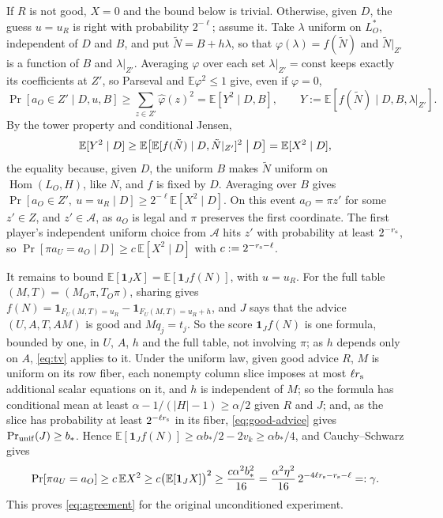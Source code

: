 \documentclass[11pt]{article}
\newcommand{\E}{\mathbb E}
\newcommand{\Hom}{\operatorname{Hom}}
\newcommand{\ind}{\mathbf 1}
\begin{document}
If $R$ is not good, $X=0$ and the bound below is trivial. Otherwise, given $D$, the guess $u=u_R$ is
right with probability $2^{-\ell}$; assume it. Take $\lambda$ uniform on
$L_O^*$, independent of $D$ and $B$, and put $\tilde N=B+h\lambda$, so that
$\varphi(\lambda)=f(\tilde N)$ and $\tilde N|_{Z'}$ is a function of $B$ and
$\lambda|_{Z'}$. Averaging $\varphi$ over each set
$\lambda|_{Z'}=\text{const}$ keeps exactly its coefficients at $Z'$, so
Parseval and $\E\varphi^2\le1$ give, even if $\varphi=0$,
\[
 \Pr[a_O\in Z'\mid D,u,B]\ge\sum_{z\in Z'}\widehat\varphi(z)^2
 =\E[Y^2\mid D,B],
 \qquad Y:=\E[f(\tilde N)\mid D,B,\lambda|_{Z'}].
\]
By the tower property and conditional Jensen,
\[
 \E[Y^2\mid D]\ge\E\bigl[\E[f(\tilde N)\mid D,\tilde N|_{Z'}]^2\bigm|D\bigr]
 =\E[X^2\mid D],
\]
the equality because, given $D$, the uniform $B$ makes $\tilde N$ uniform on
$\Hom(L_O,H)$, like $N$, and $f$ is fixed by $D$. Averaging over $B$ gives
$\Pr[a_O\in Z',\ u=u_R\mid D]\ge2^{-\ell}\E[X^2\mid D]$.
On this event $a_O=\pi z'$ for some $z'\in Z$, and $z'\in\mathcal A$, as
$a_O$ is legal and $\pi$ preserves the first coordinate. The first
player's independent uniform choice from $\mathcal A$ hits $z'$ with
probability at least $2^{-r_{\rm s}}$, so
$\Pr[\pi a_U=a_O\mid D]\ge c\,\E[X^2\mid D]$ with $c:=2^{-r_{\rm s}-\ell}$.

It remains to bound $\E[\ind_JX]=\E[\ind_Jf(N)]$, with $u=u_R$. For the
full table $(M,T)=(M_O\pi,T_O\pi)$, sharing gives
$f(N)=\ind_{F_U(M,T)=u_R}-\ind_{F_U(M,T)=u_R+h}$, and $J$ says that the
advice $(U,A,T,AM)$ is good and $Mq_j=t_j$. So the score $\ind_Jf(N)$ is one formula,
bounded by one, in $U$, $A$, $h$ and the full table, not involving $\pi$;
as $h$ depends only on $A$, \eqref{eq:tv} applies to it. Under the uniform
law, given good advice $R$, $M$ is uniform on its row fiber, each nonempty
column slice imposes at most $\ell r_{\rm s}$ additional scalar equations on
it, and $h$ is independent of $M$; so the formula has conditional mean at
least $\alpha-1/(|H|-1)\ge\alpha/2$ given $R$ and $J$; and,
as the slice has probability at least $2^{-\ell r_{\rm s}}$ in its fiber,
\eqref{eq:good-advice} gives $\Pr_{\rm unif}(J)\ge b_*$. Hence
$\E[\ind_Jf(N)]\ge\alpha b_*/2-2v_k\ge\alpha b_*/4$, and Cauchy--Schwarz
gives
\begin{equation}\label{eq:gamma}
 \Pr[\pi a_U=a_O]
 \ge c\,\E X^2
 \ge c\bigl(\E[\ind_JX]\bigr)^2
 \ge\frac{c\alpha^2b_*^2}{16}
 =\frac{\alpha^2\eta^2}{16}\,2^{-4\ell r_{\rm s}-r_{\rm s}-\ell}=:\gamma.
\end{equation}
This proves \eqref{eq:agreement} for the original unconditioned experiment.
\end{document}
